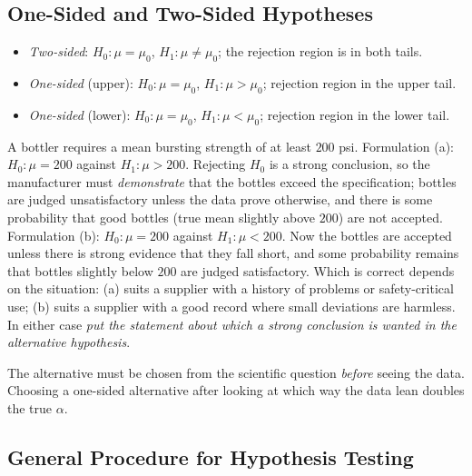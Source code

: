 \subsection{One-Sided and Two-Sided Hypotheses}

\begin{definition}
\begin{itemize}
  \item \emph{Two-sided}: $H_0:\mu=\mu_0$, $H_1:\mu\ne\mu_0$; the rejection region is in both tails.
  \item \emph{One-sided} (upper): $H_0:\mu=\mu_0$, $H_1:\mu>\mu_0$; rejection region in the upper tail.
  \item \emph{One-sided} (lower): $H_0:\mu=\mu_0$, $H_1:\mu<\mu_0$; rejection region in the lower tail.
\end{itemize}
\end{definition}

\begin{example}
A bottler requires a mean bursting strength of at least $200$ psi. Formulation (a): $H_0:\mu=200$ against $H_1:\mu>200$. Rejecting $H_0$ is a strong conclusion, so the manufacturer must \emph{demonstrate} that the bottles exceed the specification; bottles are judged unsatisfactory unless the data prove otherwise, and there is some probability that good bottles (true mean slightly above $200$) are not accepted. Formulation (b): $H_0:\mu=200$ against $H_1:\mu<200$. Now the bottles are accepted unless there is strong evidence that they fall short, and some probability remains that bottles slightly below $200$ are judged satisfactory. Which is correct depends on the situation: (a) suits a supplier with a history of problems or safety-critical use; (b) suits a supplier with a good record where small deviations are harmless. In either case \emph{put the statement about which a strong conclusion is wanted in the alternative hypothesis}.
\end{example}

The alternative must be chosen from the scientific question \emph{before} seeing the data. Choosing a one-sided alternative after looking at which way the data lean doubles the true $\alpha$.

\subsection{General Procedure for Hypothesis Testing}

